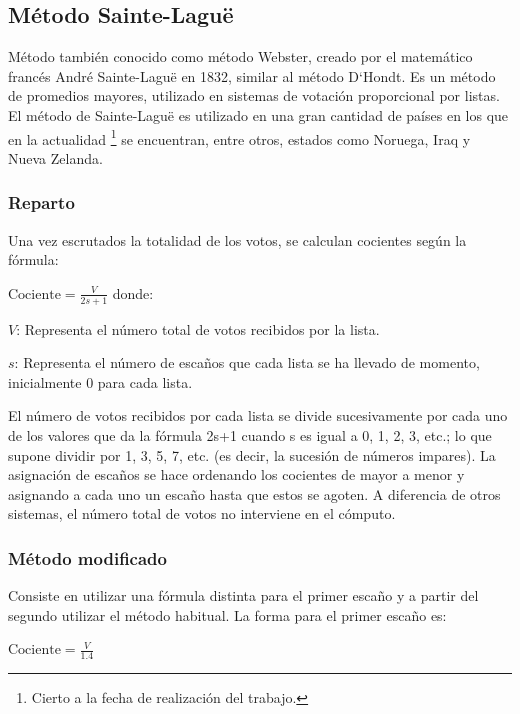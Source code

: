 \documentclass[12pt,a4paper,]{book}
\let\rmarkdownfootnote\footnote%
\def\footnote{\protect\rmarkdownfootnote}
\numberwithin{dummy}{section}
\theoremstyle{ocrenumbox}
\theoremstyle{blacknumex}
\theoremstyle{blacknumbox}
\theoremstyle{ocrenum}
\theoremstyle{ocrenum}
\begin{document}
\hypertarget{muxe9todo-sainte-laguuxeb}{%
\subsection{Método Sainte-Laguë}\label{muxe9todo-sainte-laguuxeb}}

Método también conocido como método Webster, creado por el matemático
francés André Sainte-Laguë en 1832, similar al método D`Hondt. Es un
método de promedios mayores, utilizado en sistemas de votación
proporcional por listas.\\
El método de Sainte-Laguë es utilizado en una gran cantidad de países en
los que en la actualidad \footnote{Cierto a la fecha de realización del
  trabajo.} se encuentran, entre otros, estados como Noruega, Iraq y
Nueva Zelanda.

\hypertarget{reparto-1}{%
\subsubsection{Reparto}\label{reparto-1}}

Una vez escrutados la totalidad de los votos, se calculan cocientes
según la fórmula:

\(\textrm{Cociente} = \frac{V}{2s+1}\) donde:

\(V\): Representa el número total de votos recibidos por la lista.

\(s\): Representa el número de escaños que cada lista se ha llevado de
momento, inicialmente 0 para cada lista.

El número de votos recibidos por cada lista se divide sucesivamente por
cada uno de los valores que da la fórmula 2s+1 cuando s es igual a 0, 1,
2, 3, etc.; lo que supone dividir por 1, 3, 5, 7, etc. (es decir, la
sucesión de números impares). La asignación de escaños se hace ordenando
los cocientes de mayor a menor y asignando a cada uno un escaño hasta
que estos se agoten. A diferencia de otros sistemas, el número total de
votos no interviene en el cómputo.

\hypertarget{muxe9todo-modificado}{%
\subsubsection{Método modificado}\label{muxe9todo-modificado}}

Consiste en utilizar una fórmula distinta para el primer escaño y a
partir del segundo utilizar el método habitual. La forma para el primer
escaño es:

\(\textrm{Cociente} = \frac{V}{1.4}\)
\end{document}

